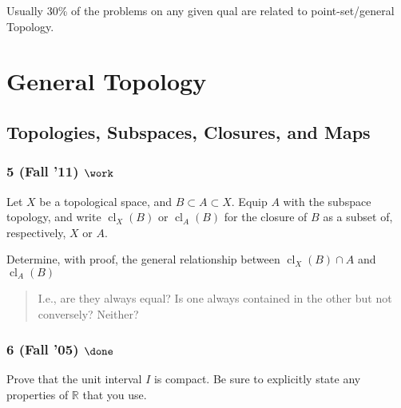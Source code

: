 \begin{warnings}

Usually 30\% of the problems on any given qual are related to
point-set/general Topology.

\end{warnings}

\hypertarget{general-topology}{%
\section{General Topology}\label{general-topology}}

\hypertarget{topologies-subspaces-closures-and-maps}{%
\subsection{Topologies, Subspaces, Closures, and
Maps}\label{topologies-subspaces-closures-and-maps}}

\hypertarget{fall-11-work}{%
\subsubsection{\texorpdfstring{5 (Fall '11)
\(\work\)}{5 (Fall '11) \textbackslash work}}\label{fall-11-work}}

Let \(X\) be a topological space, and \(B \subset A \subset X\). Equip
\(A\) with the subspace topology, and write \(\operatorname{cl}_X (B)\)
or \(\operatorname{cl}_A (B)\) for the closure of \(B\) as a subset of,
respectively, \(X\) or \(A\).

Determine, with proof, the general relationship between
\(\operatorname{cl}_X (B) \cap A\) and \(\operatorname{cl}_A (B)\)

\begin{quote}
I.e., are they always equal? Is one always contained in the other but
not conversely? Neither?
\end{quote}

\hypertarget{fall-05-done}{%
\subsubsection{\texorpdfstring{6 (Fall '05)
\(\done\)}{6 (Fall '05) \textbackslash done}}\label{fall-05-done}}

Prove that the unit interval \(I\) is compact. Be sure to explicitly
state any properties of \({\mathbb{R}}\) that you use.

